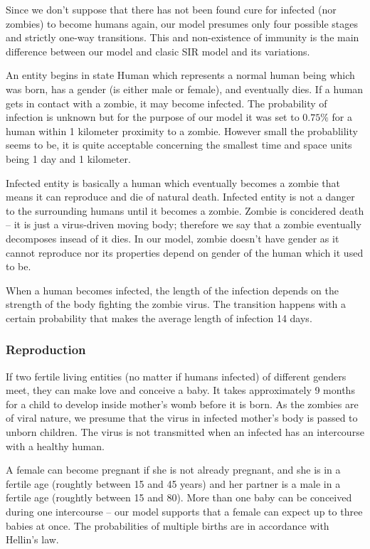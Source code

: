 \documentclass[a4paper]{article}
\begin{document}
Since we don't suppose that there has not been found cure for infected (nor zombies) to become humans again, our model presumes only four possible stages and strictly one-way transitions.
This and non-existence of immunity is the main difference between our model and clasic SIR model and its variations.

An entity begins in state Human which represents a normal human being which was born, has a gender (is either male or female), and eventually dies.
If a human gets in contact with a zombie, it may become infected.
The probability of infection is unknown but for the purpose of our model it was set to $0.75\%$ for a human within 1 kilometer proximity to a zombie.
However small the probablility seems to be, it is quite acceptable concerning the smallest time and space units being 1 day and 1 kilometer.

Infected entity is basically a human which eventually becomes a zombie that means it can reproduce and die of natural death.
Infected entity is not a danger to the surrounding humans until it becomes a zombie.
Zombie is concidered death -- it is just a virus-driven moving body; therefore we say that a zombie eventually decomposes insead of it dies.
In our model, zombie doesn't have gender as it cannot reproduce nor its properties depend on gender of the human which it used to be.

When a human becomes infected, the length of the infection depends on the strength of the body fighting the zombie virus.
The transition happens with a certain probability that makes the average length of infection 14 days.

\subsubsection{Reproduction}

If two fertile living entities (no matter if humans infected) of different genders meet, they can make love and conceive a baby.
It takes approximately 9 months for a child to develop inside mother's womb before it is born. \cite{pregnancy}
As the zombies are of viral nature, we presume that the virus in infected mother's body is passed to unborn children.
The virus is not transmitted when an infected has an intercourse with a healthy human.

A female can become pregnant if she is not already pregnant, and she is in a fertile age (roughtly between 15 and 45 years) and her partner is a male in a fertile age (roughtly between 15 and 80).
More than one baby can be conceived during one intercourse -- our model supports that a female can expect up to three babies at once.
The probabilities of multiple births are in accordance with Hellin's law. \cite{hellinslaw}
\end{document}
